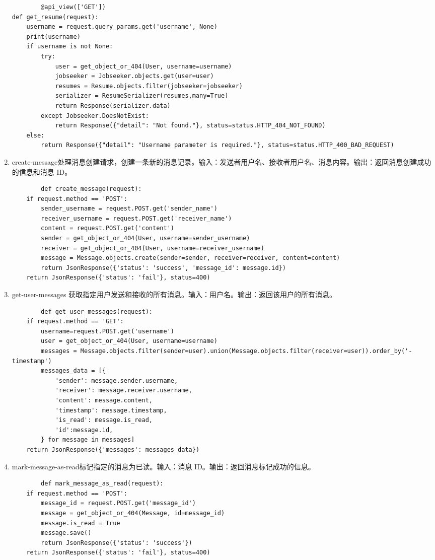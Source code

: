 \documentclass[UTF8,a4paper,10pt]{ctexart}
\begin{document}
\begin{enumerate}
    \begin{lstlisting}
        @api_view(['GET'])
def get_resume(request):
    username = request.query_params.get('username', None)
    print(username)
    if username is not None:
        try:
            user = get_object_or_404(User, username=username)
            jobseeker = Jobseeker.objects.get(user=user)
            resumes = Resume.objects.filter(jobseeker=jobseeker)
            serializer = ResumeSerializer(resumes,many=True)
            return Response(serializer.data)
        except Jobseeker.DoesNotExist:
            return Response({"detail": "Not found."}, status=status.HTTP_404_NOT_FOUND)
    else:
        return Response({"detail": "Username parameter is required."}, status=status.HTTP_400_BAD_REQUEST)
    \end{lstlisting}
    \item create-message处理消息创建请求，创建一条新的消息记录。输入：发送者用户名、接收者用户名、消息内容。输出：返回消息创建成功的信息和消息 ID。
    \begin{lstlisting}
        def create_message(request):
    if request.method == 'POST':
        sender_username = request.POST.get('sender_name')
        receiver_username = request.POST.get('receiver_name')
        content = request.POST.get('content')
        sender = get_object_or_404(User, username=sender_username)
        receiver = get_object_or_404(User, username=receiver_username)
        message = Message.objects.create(sender=sender, receiver=receiver, content=content)
        return JsonResponse({'status': 'success', 'message_id': message.id})
    return JsonResponse({'status': 'fail'}, status=400)
    \end{lstlisting}
    \item get-user-messages 获取指定用户发送和接收的所有消息。输入：用户名。输出：返回该用户的所有消息。
    \begin{lstlisting}
        def get_user_messages(request):
    if request.method == 'GET':
        username=request.POST.get('username')
        user = get_object_or_404(User, username=username)
        messages = Message.objects.filter(sender=user).union(Message.objects.filter(receiver=user)).order_by('-timestamp')
        messages_data = [{
            'sender': message.sender.username,
            'receiver': message.receiver.username,
            'content': message.content,
            'timestamp': message.timestamp,
            'is_read': message.is_read,
            'id':message.id,
        } for message in messages]
    return JsonResponse({'messages': messages_data})
    \end{lstlisting}
    \item mark-message-as-read标记指定的消息为已读。输入：消息 ID。输出：返回消息标记成功的信息。
    \begin{lstlisting}
        def mark_message_as_read(request):
    if request.method == 'POST':
        message_id = request.POST.get('message_id')
        message = get_object_or_404(Message, id=message_id)
        message.is_read = True
        message.save()
        return JsonResponse({'status': 'success'})
    return JsonResponse({'status': 'fail'}, status=400)
    \end{lstlisting}
\end{enumerate}
\end{document}
